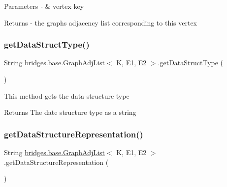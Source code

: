 \begin{DoxyParams}{Parameters}
{\em -\/} & vertex key\\
\hline
\end{DoxyParams}
\begin{DoxyReturn}{Returns}
-\/ the graph\textquotesingle{}s adjacency list corresponding to this vertex 
\end{DoxyReturn}
\mbox{\label{classbridges_1_1base_1_1_graph_adj_list_a40c4a2faf20c9847e8ba0d8024236a4b}} 
\subsubsection{\texorpdfstring{get\+Data\+Struct\+Type()}{getDataStructType()}}
{\footnotesize\ttfamily String \mbox{\hyperlink{classbridges_1_1base_1_1_graph_adj_list}{bridges.\+base.\+Graph\+Adj\+List}}$<$ K, E1, E2 $>$.get\+Data\+Struct\+Type (\begin{DoxyParamCaption}{ }\end{DoxyParamCaption})}

This method gets the data structure type

\begin{DoxyReturn}{Returns}
The date structure type as a string 
\end{DoxyReturn}
\mbox{\label{classbridges_1_1base_1_1_graph_adj_list_a9bba66056cdf24197c41fff455e19a6c}} 
\subsubsection{\texorpdfstring{get\+Data\+Structure\+Representation()}{getDataStructureRepresentation()}}
{\footnotesize\ttfamily String \mbox{\hyperlink{classbridges_1_1base_1_1_graph_adj_list}{bridges.\+base.\+Graph\+Adj\+List}}$<$ K, E1, E2 $>$.get\+Data\+Structure\+Representation (\begin{DoxyParamCaption}{ }\end{DoxyParamCaption})}

